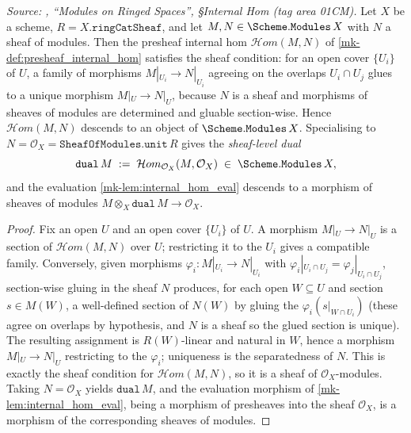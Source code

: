 \begin{lemma}\label{mk-lem:internal_hom_isSheaf}
  \leanok

  \textit{Source: \cite{stacks-project}, ``Modules on Ringed Spaces'', \S Internal Hom
  (tag area 01CM).}
  Let \(X\) be a scheme, \(R = X.\mathtt{ringCatSheaf}\), and let
  \(M, N \in \Scheme.\mathtt{Modules}\,X\) with \(N\) a sheaf of modules. Then the
  presheaf internal hom \(\mathcal{H}om(M, N)\) of \ref{mk-def:presheaf_internal_hom}
  satisfies the sheaf condition: for an open cover \(\{U_i\}\) of \(U\), a family of
  morphisms \(M|_{U_i} \to N|_{U_i}\) agreeing on the overlaps
  \(U_i \cap U_j\) glues to a unique morphism \(M|_U \to N|_U\), because \(N\) is a
  sheaf and morphisms of sheaves of modules are determined and gluable section-wise.
  Hence \(\mathcal{H}om(M, N)\) descends to an object of \(\Scheme.\mathtt{Modules}\,X\).
  Specialising to \(N = \mathcal{O}_X = \mathtt{SheafOfModules.unit}\,R\) gives the
  \emph{sheaf-level dual}
  \[
    \mathtt{dual}\,M \;:=\; \mathcal{H}om_{\mathcal{O}_X}(M, \mathcal{O}_X)
    \;\in\; \Scheme.\mathtt{Modules}\,X,
  \]
  and the evaluation \ref{mk-lem:internal_hom_eval} descends to a morphism of sheaves of
  modules \(M \otimes_X \mathtt{dual}\,M \to \mathcal{O}_X\).
\end{lemma}

\begin{proof}
  \leanok
  Fix an open \(U\) and an open cover \(\{U_i\}\) of \(U\). A morphism
  \(M|_U \to N|_U\) is a section of \(\mathcal{H}om(M, N)\) over \(U\); restricting it
  to the \(U_i\) gives a compatible family. Conversely, given morphisms
  \(\varphi_i : M|_{U_i} \to N|_{U_i}\) with \(\varphi_i|_{U_i \cap U_j} =
  \varphi_j|_{U_i \cap U_j}\), section-wise gluing in the sheaf \(N\) produces, for
  each open \(W \subseteq U\) and section \(s \in M(W)\), a well-defined section of
  \(N(W)\) by gluing the \(\varphi_i(s|_{W \cap U_i})\) (these agree on overlaps by
  hypothesis, and \(N\) is a sheaf so the glued section is unique). The resulting
  assignment is \(R(W)\)-linear and natural in \(W\), hence a morphism
  \(M|_U \to N|_U\) restricting to the \(\varphi_i\); uniqueness is the separatedness
  of \(N\). This is exactly the sheaf condition for \(\mathcal{H}om(M, N)\), so it is a
  sheaf of \(\mathcal{O}_X\)-modules. Taking \(N = \mathcal{O}_X\) yields
  \(\mathtt{dual}\,M\), and the evaluation morphism of \ref{mk-lem:internal_hom_eval},
  being a morphism of presheaves into the sheaf \(\mathcal{O}_X\), is a morphism of
  the corresponding sheaves of modules.
\end{proof}

